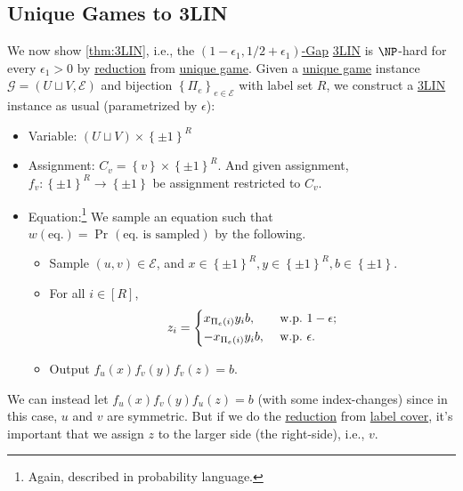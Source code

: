 \subsection{Unique Games to 3LIN}
We now show \autoref{thm:3LIN}, i.e., the \hyperref[def:c-s-Gap]{\((1 - \epsilon_1 , 1 / 2 + \epsilon_1 )\)-Gap} \hyperref[prb:max-3LIN]{3LIN} is \(\NP\)-hard for every \(\epsilon _1 > 0\) by \hyperref[def:reduction]{reduction} from \hyperref[prb:unique-game]{unique game}. Given a \hyperref[prb:unique-game]{unique game} instance \(\mathcal{G} =(U \sqcup V, \mathcal{E} )\) and bijection \(\left\{ \Pi _e \right\}_{e\in \mathcal{E} } \) with label set \(R\), we construct a \hyperref[prb:max-3LIN]{3LIN} instance as usual (parametrized by \(\epsilon \)):
\begin{itemize}
	\item Variable: \((U \sqcup V) \times \left\{ \pm 1 \right\} ^R\)
	\item Assignment: \(C_v = \left\{ v \right\} \times \left\{ \pm 1 \right\} ^R\). And given assignment, \(f_v \colon \left\{ \pm 1 \right\} ^R \to \left\{ \pm 1 \right\} \) be assignment restricted to \(C_v\).
	\item Equation:\footnote{Again, described in probability language.} We sample an equation such that \(w(\text{eq.}) = \Pr_{}(\text{eq. is sampled} )\) by the following.
	      \begin{itemize}
		      \item Sample \((u, v)\in \mathcal{E} \), and \(x\in \left\{ \pm 1 \right\} ^R, y\in \left\{ \pm 1 \right\} ^R, b\in \left\{ \pm 1 \right\} \).
		      \item For all \(i\in [R]\),
		            \[
			            z_i = \begin{dcases}
				            x_{\Pi_e (i)} y_i b,  & \text{ w.p.\ } 1-\epsilon  ; \\
				            -x_{\Pi_e (i)} y_i b, & \text{ w.p.\ } \epsilon  .
			            \end{dcases}
		            \]
		      \item Output \(f_u(x) f_v(y) f_v(z) = b\).
	      \end{itemize}
\end{itemize}

\begin{remark}
	We can instead let \(f_u(x) f_v(y) f_u(z) = b\) (with some index-changes) since in this case, \(u\) and \(v\) are symmetric. But if we do the \hyperref[def:reduction]{reduction} from \hyperref[prb:label-cover]{label cover}, it's important that we assign \(z\) to the larger side (the right-side), i.e., \(v\).
\end{remark}

